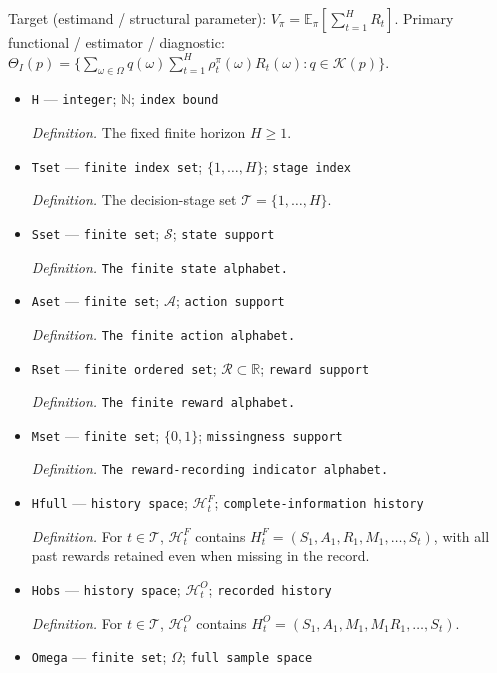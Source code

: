 \documentclass{article}
\begin{document}
Target (estimand / structural parameter): \(V_\pi=\mathbb E_\pi[\sum_{t=1}^H R_t]\).
Primary functional / estimator / diagnostic: \(\Theta_I(p)=\{\sum_{\omega\in\Omega}q(\omega)\sum_{t=1}^H\rho_t^\pi(\omega)R_t(\omega):q\in\mathcal K(p)\}\).
\begin{itemize}
  \item \texttt{H} --- \texttt{integer}; \(\mathbb N\); \texttt{index bound}
  \par\smallskip\noindent\emph{Definition.} The fixed finite horizon \(H\ge 1\).
  \item \texttt{Tset} --- \texttt{finite index set}; \(\{1,\ldots,H\}\); \texttt{stage index}
  \par\smallskip\noindent\emph{Definition.} The decision-stage set \(\mathcal T=\{1,\ldots,H\}\).
  \item \texttt{Sset} --- \texttt{finite set}; \(\mathcal S\); \texttt{state support}
  \par\smallskip\noindent\emph{Definition.} \texttt{The finite state alphabet.}
  \item \texttt{Aset} --- \texttt{finite set}; \(\mathcal A\); \texttt{action support}
  \par\smallskip\noindent\emph{Definition.} \texttt{The finite action alphabet.}
  \item \texttt{Rset} --- \texttt{finite ordered set}; \(\mathcal R\subset\mathbb R\); \texttt{reward support}
  \par\smallskip\noindent\emph{Definition.} \texttt{The finite reward alphabet.}
  \item \texttt{Mset} --- \texttt{finite set}; \(\{0,1\}\); \texttt{missingness support}
  \par\smallskip\noindent\emph{Definition.} \texttt{The reward-\allowbreak{}recording indicator alphabet.}
  \item \texttt{Hfull} --- \texttt{history space}; \(\mathcal H_t^F\); \texttt{complete-\allowbreak{}information history}
  \par\smallskip\noindent\emph{Definition.} For \(t\in\mathcal T\), \(\mathcal H_t^F\) contains \(H_t^F=(S_1,A_1,R_1,M_1,\ldots,S_t)\), with all past rewards retained even when missing in the record.
  \item \texttt{Hobs} --- \texttt{history space}; \(\mathcal H_t^O\); \texttt{recorded history}
  \par\smallskip\noindent\emph{Definition.} For \(t\in\mathcal T\), \(\mathcal H_t^O\) contains \(H_t^O=(S_1,A_1,M_1,M_1R_1,\ldots,S_t)\).
  \item \texttt{Omega} --- \texttt{finite set}; \(\Omega\); \texttt{full sample space}

\end{itemize}
\end{document}

